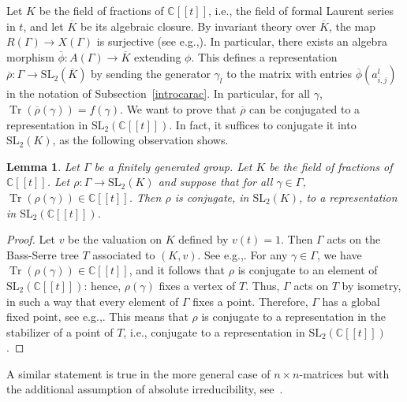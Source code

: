 \documentclass[11pt]{article}
\newcommand{\ie}{i.e.,\xspace}
\newcommand{\eg}{e.g.,\xspace}
\newcommand{\lbr}{[\![}
\newcommand{\rbr}{]\!]}
\newtheorem{lemma}[theorem]{Lemma}
\theoremstyle{definition}
\newcommand{\CC}{\mathbb{C}}
\newcommand{\tr}{\operatorname{Tr}}
\newcommand{\SL}{\mathrm{SL}}
\begin{document}
Let $K$ be the field of fractions of $\CC\lbr t\rbr$, \ie 
the field of formal
Laurent series in $t$, and let $\overline{K}$ be its algebraic closure.
By invariant theory over $\overline{K}$, the map $R(\Gamma)\to X(\Gamma)$
is surjective (see \eg \cite[Th.\,5.9]{Mukai}).
In particular, there exists
an algebra morphism $\overline{\phi}\colon A(\Gamma)\to\overline{K}$
extending $\phi$. This defines a representation
$\overline{\rho}\colon\Gamma\to\SL_2(\overline{K})$ by sending the generator
$\gamma_l$ to the matrix with entries $\overline{\phi}(a^l_{i,j})$ in the
notation of Subsection~\ref{introcarac}. In particular, for all $\gamma$,
$\tr(\overline{\rho}(\gamma))=f(\gamma)$. We want to prove that
$\overline{\rho}$ can be conjugated to a representation in $\SL_2(\CC\lbr t\rbr)$.
In fact, it suffices to conjugate it into $\SL_2(K)$, as the following
observation shows.
\begin{lemma}\label{lem:TousEnsemble}
Let $\Gamma$ be a finitely generated group. Let $K$ be the field of
fractions of $\CC\lbr t\rbr$. Let $\rho\colon\Gamma\to\SL_2(K)$ and suppose that
for all $\gamma\in\Gamma$, $\tr(\rho(\gamma))\in\CC\lbr t\rbr$. Then $\rho$ is
conjugate, in $\SL_2(K)$, to a representation in $\SL_2(\CC\lbr t\rbr)$.
\end{lemma}
\begin{proof}
Let $v$ be the valuation on $K$ defined by $v(t)=1$. Then $\Gamma$ acts on
the Bass-Serre tree $T$ associated to $(K,v)$.
See \eg \cite[Chap.\,2]{Serre}.
For any $\gamma\in\Gamma$, we have $\tr(\rho(\gamma))\in\CC\lbr t\rbr$, and
it follows that $\rho$ is conjugate to an element of $\SL_2(\CC\lbr t\rbr)$:
hence, $\rho(\gamma)$ fixes a vertex of $T$.
Thus, $\Gamma$ acts on $T$ by isometry, in such a way that every element
of $\Gamma$ fixes a point. Therefore, $\Gamma$ has a global fixed point,
see \eg \cite[Chap.\,I.6.5, Cor.\,3]{Serre}.
This means that $\rho$ is conjugate to a representation in the stabilizer
of a point of $T$, \ie 
conjugate to a representation in $\SL_2(\CC\lbr t\rbr)$.
\end{proof}
A similar statement is true in the more general case of $n\times n$-matrices
but with the additional assumption of absolute irreducibility,
see~\cite[Lem.\,1.4.3]{CullerShalen}.
\end{document}

